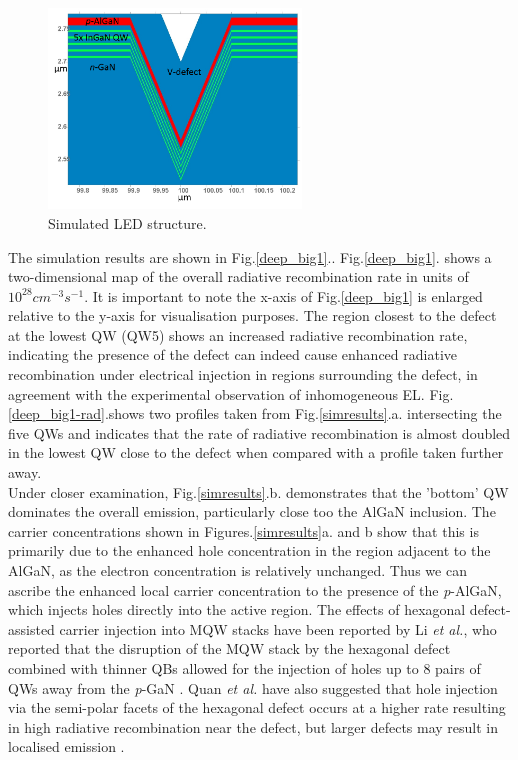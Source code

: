 \begin{figure}[h]
	\centering
	\includegraphics[width=0.6\textwidth]{Figs/Ch3/Sim}
	\caption[h] {Simulated LED structure.}
	\label{simsetup}
\end{figure}
\FloatBarrier 

The simulation results are shown in Fig.\ref{deep_big1}.. Fig.\ref{deep_big1}. shows a two-dimensional map of the overall radiative recombination rate in units of $10^{28} cm^{-3}s^{-1}$. It is important to note the x-axis of Fig.\ref{deep_big1} is enlarged relative to the y-axis for visualisation purposes. The region closest to the defect at the lowest QW (QW5) shows an increased radiative recombination rate, indicating the presence of the defect can indeed cause enhanced radiative recombination under electrical injection in regions surrounding the defect, in agreement with the experimental observation of inhomogeneous EL. Fig.\ref{deep_big1-rad}.shows two profiles taken from Fig.\ref{simresults}.a. intersecting the five QWs and indicates that the rate of radiative recombination is almost doubled in the lowest QW close to the defect when compared with a profile taken further away.\\
Under closer examination, Fig.\ref{simresults}.b. demonstrates that the 'bottom' QW dominates the overall emission, particularly close too the AlGaN inclusion. The carrier concentrations shown in Figures.\ref{simresults}a. and b show that this is primarily due to the enhanced hole concentration in the region adjacent to the AlGaN, as the electron concentration is relatively unchanged. Thus we can ascribe the enhanced local carrier concentration to the presence of the \textit{p}-AlGaN, which injects holes directly into the active region. The effects of hexagonal defect-assisted carrier injection into MQW stacks have been reported by Li \textit{et al.}, who reported that the disruption of the MQW stack by the hexagonal defect combined with thinner QBs allowed for the injection of holes up to 8 pairs of QWs away from the \textit{p}-GaN \cite{Li2014}. Quan \textit{et al.} have also suggested that hole injection via the semi-polar facets of the hexagonal defect occurs at a higher rate resulting in high radiative recombination near the defect, but larger defects may result in localised emission \cite{Quan2014}.

